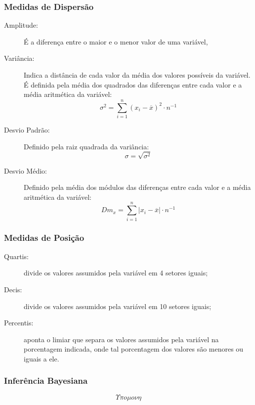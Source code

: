     \subsubsection{Medidas de Dispersão}
        \begin{description}
            \item[Amplitude:]
                É a diferença entre o maior e o menor valor de uma variável,
            \item[Variância:]
                Indica a distância de cada valor da média dos valores possíveis da variável. É definida pela média dos quadrados das diferenças entre cada valor e a média aritmética da variável:
                \[ \sigma^2 = \displaystyle\sum_{i=1}^{n} {(x_i - \overline{x})^2 \cdot n^{-1}}  \]
            \item[Desvio Padrão:]
                Definido pela raiz quadrada da variância:
                \[ \sigma = \sqrt{\sigma^2} \]
            \item[Desvio Médio:]
                Definido pela média dos módulos das diferenças entre cada valor e a média aritmética da variável:
                \[ Dm_x = \displaystyle\sum_{i=1}^{n} {|x_i - \overline{x}| \cdot n^{-1}} \]
        \end{description}
    \subsubsection{Medidas de Posição}
        \begin{description}
            \item[Quartis:] divide os valores assumidos pela variável em 4 setores iguais;
            \item[Decis:] divide os valores assumidos pela variável em 10 setores iguais;
            \item[Percentis:] aponta o limiar que separa os valores assumidos pela variável na porcentagem indicada, onde tal porcentagem dos valores são menores ou iguais a ele.
        \end{description}
    \subsubsection{Inferência Bayesiana}
        \[ \Upsilon \pi o \mu o \nu \eta \]